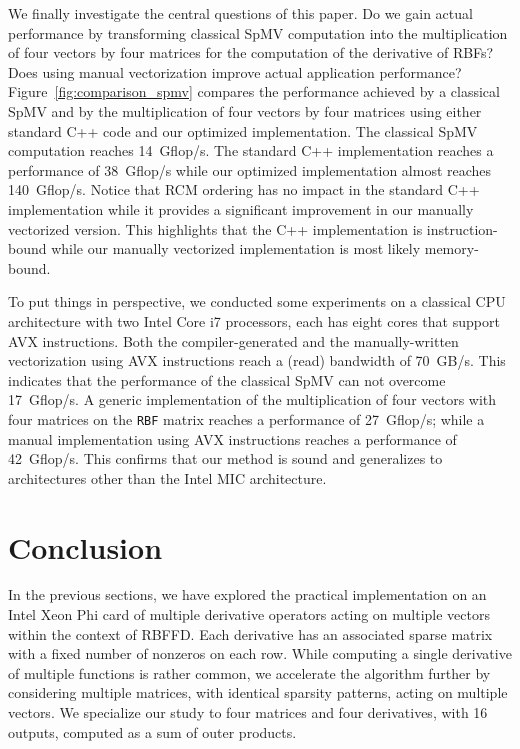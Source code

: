 \documentclass{sig-alternate}
\begin{document}
We finally investigate the central questions of this paper. Do we gain
actual performance by transforming classical SpMV computation into the
multiplication of four vectors by four matrices for the computation of the
derivative of RBFs? Does using manual vectorization improve actual
application performance? Figure~\ref{fig:comparison_spmv} compares the
performance achieved by a classical SpMV and by the multiplication of
four vectors by four matrices using either standard C++ code and our
optimized implementation. The
classical SpMV computation reaches 14~Gflop/s. 
The standard C++ implementation reaches a performance of 38~Gflop/s while our
optimized implementation almost reaches 140~Gflop/s. 
Notice that 
RCM ordering has no impact in the standard C++ implementation while it
provides a significant improvement in our manually vectorized
version. This highlights that the C++ implementation is instruction-bound
while our manually vectorized implementation is most likely 
memory-bound. 

To put things in perspective, we conducted some experiments on a
classical CPU architecture with two Intel Core i7 processors, each has eight
cores that support AVX instructions. Both the compiler-generated and
the manually-written vectorization using AVX instructions reach a
(read) bandwidth of 70~GB/s. This indicates that the performance of
the classical SpMV can not overcome 17~Gflop/s. A generic
implementation of the multiplication of four vectors with four matrices on
the {\tt RBF} matrix reaches a performance of 27~Gflop/s; while a
manual implementation using AVX instructions reaches a performance of
42~Gflop/s. This confirms that our method is sound and generalizes to
architectures other than the Intel MIC architecture.

\vspace{-0.5em}
\section{Conclusion}
\label{sec:ccl}

In the previous sections, we have explored the practical
implementation on an Intel Xeon Phi card of multiple derivative
operators acting on multiple vectors within the context of
RBFFD. Each derivative has an associated sparse matrix with a fixed
number of nonzeros on each row. While computing a single derivative of
multiple functions is rather common, we accelerate the algorithm further 
by considering multiple
matrices, with identical sparsity patterns, acting on multiple vectors. 
We specialize our study to four matrices and four derivatives,
with 16 outputs, computed as a sum of outer products.
\end{document}
